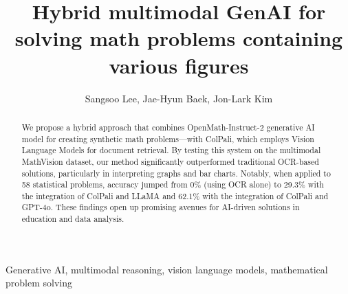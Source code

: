 \documentclass[a4paper,twoside,flushend, 10pt]{article}
\begin{document}
\title{Hybrid multimodal GenAI for solving math problems containing various figures}

\author{Sangsoo Lee, Jae-Hyun Baek, Jon-Lark Kim}


\begin{abstract}
We propose a hybrid approach that combines OpenMath-Instruct-2 generative AI model for creating synthetic math problems—with ColPali, which employs Vision Language Models for document retrieval. By testing this system on the multimodal MathVision dataset, our method significantly outperformed traditional OCR-based solutions, particularly in interpreting graphs and bar charts. Notably, when applied to 58 statistical problems, accuracy jumped from 0\% (using OCR alone) to 29.3\% with the integration of ColPali and LLaMA and 62.1\% with the integration of ColPali and GPT-4o. These findings open up promising avenues for AI-driven solutions in education and data analysis.
\end{abstract}

\begin{keyword}
Generative AI, multimodal reasoning, vision language models, mathematical problem solving
\end{keyword}
\end{document}
